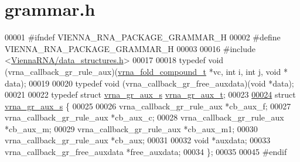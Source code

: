 \hypertarget{grammar_8h_source}{}\section{grammar.\+h}
\label{grammar_8h_source}

\begin{DoxyCode}
00001 \textcolor{preprocessor}{#ifndef VIENNA\_RNA\_PACKAGE\_GRAMMAR\_H}
00002 \textcolor{preprocessor}{#define VIENNA\_RNA\_PACKAGE\_GRAMMAR\_H}
00003 
00016 \textcolor{preprocessor}{#include <\hyperlink{data__structures_8h}{ViennaRNA/data\_structures.h}>}
00017 
00018 \textcolor{keyword}{typedef} void (vrna\_callback\_gr\_rule\_aux)(\hyperlink{group__fold__compound_structvrna__fc__s}{vrna\_fold\_compound\_t} *vc, \textcolor{keywordtype}{int} i, \textcolor{keywordtype}{int} j, \textcolor{keywordtype}{void} *
      data);
00019 
00020 \textcolor{keyword}{typedef} void (vrna\_callback\_gr\_free\_auxdata)(\textcolor{keywordtype}{void} *data);
00021 
00022 \textcolor{keyword}{typedef} \textcolor{keyword}{struct }\hyperlink{group__grammar_structvrna__gr__aux__s}{vrna\_gr\_aux\_s}  \hyperlink{group__grammar_structvrna__gr__aux__s}{vrna\_gr\_aux\_t};
00023 
\hyperlink{group__grammar}{00024} \textcolor{keyword}{struct }\hyperlink{group__grammar_structvrna__gr__aux__s}{vrna\_gr\_aux\_s} \{
00025 
00026   vrna\_callback\_gr\_rule\_aux     *cb\_aux\_f;
00027   vrna\_callback\_gr\_rule\_aux     *cb\_aux\_c;
00028   vrna\_callback\_gr\_rule\_aux     *cb\_aux\_m;
00029   vrna\_callback\_gr\_rule\_aux     *cb\_aux\_m1;
00030   vrna\_callback\_gr\_rule\_aux     *cb\_aux;
00031 
00032   \textcolor{keywordtype}{void}                          *auxdata;
00033   vrna\_callback\_gr\_free\_auxdata *free\_auxdata;
00034 \};
00035 
00045 \textcolor{preprocessor}{#endif}
\end{DoxyCode}
